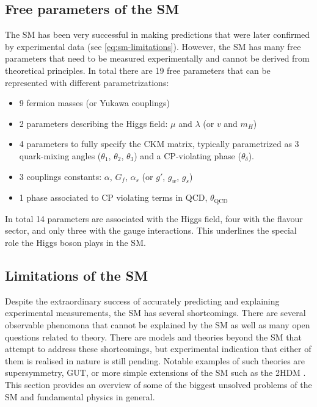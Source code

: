 \subsection{Free parameters of the SM}
\label{subsec:free-pars-sm}
The SM has been very successful in making predictions that were later confirmed by experimental data (see \cref{eq:sm-limitations}). However, the SM has many free parameters that need to be measured experimentally and cannot be derived from theoretical principles.  
In total there are 19 free parameters that can be represented with different parametrizations:
\begin{itemize}
  \item 9 fermion masses (or Yukawa couplings)
  \item 2 parameters describing the Higgs field: $\mu$ and $\lambda$ (or $v$ and $m_H$)
  \item 4 parameters to fully specify the CKM matrix, typically parametrized as 3 quark-mixing angles ($\theta_1$, $\theta_2$, $\theta_3$) and a CP-violating phase ($\theta_\delta$).
  \item 3 couplings constants: $\alpha$, $G_f$, $\alpha_s$ (or $g'$, $g_w$, $g_s$)
  \item 1 phase associated to CP violating terms in QCD, $\theta_{\text{QCD}}$
\end{itemize}
In total 14 parameters are associated with the Higgs field, four with the flavour sector, and only three with the gauge interactions. This underlines the special role the Higgs boson plays in the SM.


\subsection{Limitations of the SM}
\label{subsec:limitations}
Despite the extraordinary success of accurately predicting and explaining experimental measurements, the SM has several shortcomings.
There are several observable phenomona that cannot be explained by the SM as well as many open questions related to theory. 
There are models and theories beyond the SM that attempt to address these shortcomings, but experimental indication that either of them is realised in nature is still pending.
Notable examples of such theories are supersymmetry, GUT, or more simple extensions of the SM such as the 2HDM . 
This section provides an overview of some of the biggest unsolved problems of the SM and fundamental physics in general.


